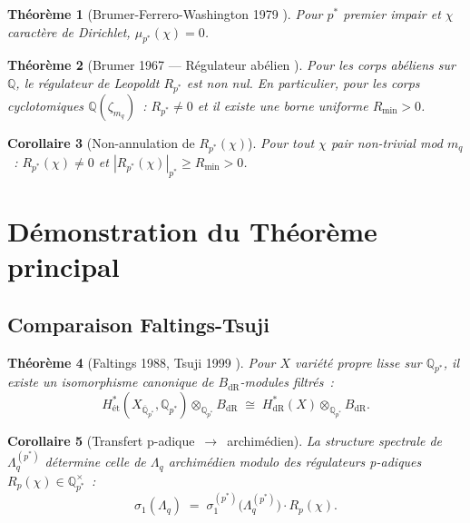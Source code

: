 \documentclass[11pt,a4paper]{article}
\newtheorem{theorem}{Théorème}[section]
\newtheorem{corollary}[theorem]{Corollaire}
\theoremstyle{definition}
\newcommand{\Q}{\mathbb{Q}}
\newcommand{\dR}{\mathrm{dR}}
\newcommand{\et}{\text{ét}}
\begin{document}
\begin{theorem}[Brumer-Ferrero-Washington 1979 {\upshape [PROUVÉ]}]
\label{thm:bfw}
Pour $p^*$ premier impair et $\chi$ caractère de Dirichlet,
$\mu_{p^*}(\chi) = 0$.
\end{theorem}

\begin{theorem}[Brumer 1967 — Régulateur abélien {\upshape [PROUVÉ]}]
\label{thm:brumer}
Pour les corps abéliens sur $\Q$, le régulateur de Leopoldt $R_{p^*}$
est non nul. En particulier, pour les corps cyclotomiques
$\Q(\zeta_{m_q})$~: $R_{p^*}\neq 0$ et il existe une borne uniforme
$R_{\min} > 0$.
\end{theorem}

\begin{corollary}[Non-annulation de $R_{p^*}(\chi)$]
\label{cor:reg_nonzero}
Pour tout $\chi$ pair non-trivial mod $m_q$~: $R_{p^*}(\chi)\neq 0$
et $|R_{p^*}(\chi)|_{p^*} \geq R_{\min} > 0$.
\end{corollary}

\section{Démonstration du Théorème principal}
\label{sec:main}

\subsection{Comparaison Faltings-Tsuji}

\begin{theorem}[Faltings 1988, Tsuji 1999 {\upshape [PROUVÉ]}]
\label{thm:faltings_tsuji}
Pour $X$ variété propre lisse sur $\Q_{p^*}$, il existe un
isomorphisme canonique de $B_{\dR}$-modules filtrés~:
\begin{equation}
  H^*_{\et}(X_{\overline{\Q}_{p^*}}, \Q_{p^*}) \otimes_{\Q_{p^*}} B_{\dR}
  \;\cong\;
  H^*_{\dR}(X) \otimes_{\Q_{p^*}} B_{\dR}.
\end{equation}
\end{theorem}

\begin{corollary}[Transfert p-adique~$\to$~archimédien]
\label{cor:padic_archim}
La structure spectrale de $\Lambda_q^{(p^*)}$ détermine celle de
$\Lambda_q$ archimédien modulo des régulateurs p-adiques
$R_p(\chi)\in\Q_{p^*}^\times$~:
\begin{equation}
  \sigma_1(\Lambda_q) \;=\;
  \sigma_1^{(p^*)}\!\big(\Lambda_q^{(p^*)}\big) \cdot R_p(\chi).
\end{equation}
\end{corollary}
\end{document}
